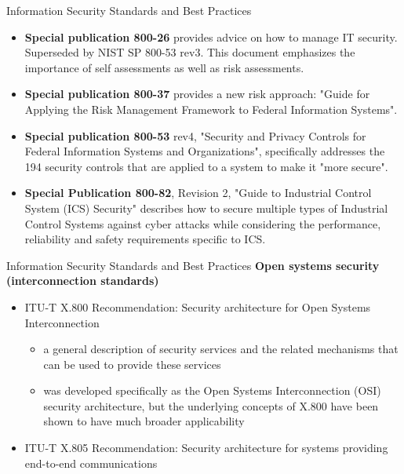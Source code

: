 \documentclass[pdf]{beamer}
\begin{document}
\begin{frame}{Information Security Standards and Best Practices}
\begin{itemize}
\item
\textbf{Special publication 800-26} provides advice on how to manage IT security. Superseded by NIST SP 800-53 rev3. This document emphasizes the importance of self assessments as well as risk assessments.

\item
\textbf{Special publication 800-37} provides a new risk approach: "Guide for Applying the Risk Management Framework to Federal Information Systems".

\item
\textbf{Special publication 800-53} rev4, "Security and Privacy Controls for Federal Information Systems and Organizations", specifically addresses the 194 security controls that are applied to a system to make it "more secure".

\item
\textbf{Special Publication 800-82}, Revision 2, "Guide to Industrial Control System (ICS) Security" describes how to secure multiple types of Industrial Control Systems against cyber attacks while considering the performance, reliability and safety requirements specific to ICS. 
\end{itemize}
\end{frame}



\begin{frame}{Information Security Standards and Best Practices}
\textbf{Open systems security (interconnection standards)}
\begin{itemize}
\item
 ITU-T X.800 Recommendation: Security architecture for Open Systems Interconnection

\begin{itemize}
\item
a general description of security services and the related mechanisms that can be used to provide these services

\item
was developed specifically as the Open Systems Interconnection (OSI) security architecture, but the underlying concepts of X.800 have been shown to have much broader applicability 
\end{itemize}

\item
ITU-T X.805 Recommendation: Security architecture for systems providing end-to-end communications 

\end{itemize}
\end{frame}
\end{document}
